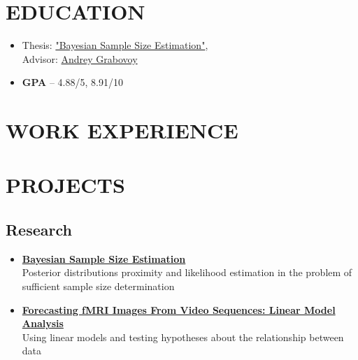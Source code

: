 \documentclass[12pt]{moderncv}
\begin{document}
    \makecvtitle

    \section{EDUCATION}

        \begin{itemize}
            \item Thesis: \href{https://github.com/intsystems/Kiselev-BS-Thesis}{"Bayesian Sample Size Estimation"},\\
            Advisor: \href{https://andriygav.github.io}{Andrey Grabovoy}
            \item \textbf{GPA} -- 4.88/5, 8.91/10
        \end{itemize}

    \section{WORK EXPERIENCE}


    \section{PROJECTS}

        \subsection{Research}

        \begin{itemize}
            \item \href{https://github.com/kisnikser/Bayesian-Sample-Size-Estimation}{\textbf{Bayesian Sample Size Estimation}}\\
            Posterior distributions proximity and likelihood estimation in the problem of
            sufficient sample size determination
            \item \href{https://github.com/intsystems/2023-Project-112}{\textbf{Forecasting fMRI Images From Video Sequences: Linear Model Analysis}}\\
            Using linear models and testing hypotheses about the relationship between data
        \end{itemize}
\end{document}

